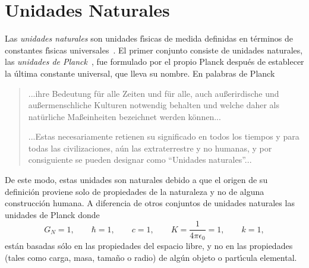\section{Unidades Naturales}
\label{sec:NU}
Las \emph{unidades naturales} son unidades f\'\i sicas de medida definidas en t\'erminos de constantes f\'\i sicas universales~\cite{NU}. El primer conjunto consiste de unidades naturales, las \emph{unidades de Planck}~\cite{PU},  fue formulado por el propio Planck despu\'es de establecer la \'ultima constante universal, que lleva su nombre.  En palabras de Planck
\begin{quotation} %

  ...ihre Bedeutung f\"ur alle Zeiten und f\"ur alle, auch au\ss erirdische und au\ss ermenschliche Kulturen notwendig behalten und welche daher als \guillemotright nat\"urliche Ma\ss einheiten bezeichnet werden k\"onnen... %

...Estas necesariamente retienen su significado en todos los tiempos y para todas las civilizaciones, aún las extraterrestre y no humanas, y por consiguiente se pueden designar como ``Unidades naturales''...
\end{quotation} %
De este modo, estas unidades son naturales debido a que el origen de su definici\'on proviene solo de propiedades de la naturaleza y no de alguna construcci\'on humana. A diferencia de otros conjuntos de unidades naturales las unidades de Planck donde
\begin{equation}
\label{eq:144}
  G_N=1,\qquad \hbar=1,\qquad c=1,\qquad K=\frac{1}{4\pi\epsilon_0}=1,\qquad k=1,
\end{equation}
est\'an basadas s\'olo en las propiedades del espacio libre, y no en las propiedades (tales como carga, masa, tama\~no o radio) de alg\'un objeto o part\'\i cula elemental.

